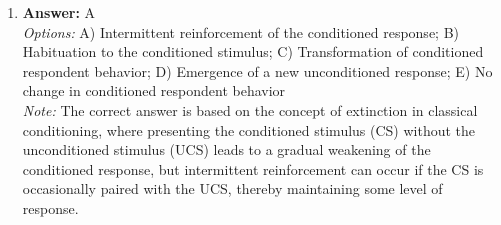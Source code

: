 \documentclass[12pt]{article}
\begin{document}
\begin{enumerate}[label=\arabic*.]
\item \textbf{Answer:} A
\\ \textit{Options:} A) Intermittent reinforcement of the conditioned response; B) Habituation to the conditioned stimulus; C) Transformation of conditioned respondent behavior; D) Emergence of a new unconditioned response; E) No change in conditioned respondent behavior
\\ \textit{Note:} The correct answer is based on the concept of extinction in classical conditioning, where presenting the conditioned stimulus (CS) without the unconditioned stimulus (UCS) leads to a gradual weakening of the conditioned response, but intermittent reinforcement can occur if the CS is occasionally paired with the UCS, thereby maintaining some level of response.
\end{enumerate}
\end{document}
